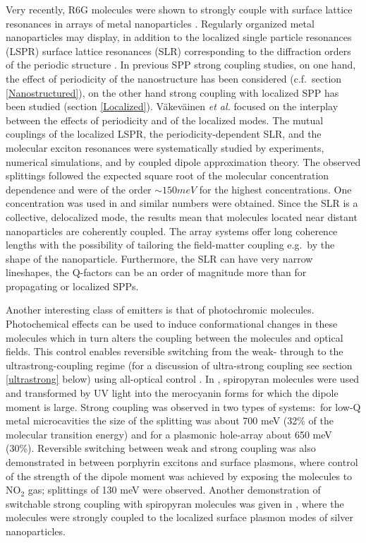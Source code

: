 \documentclass[12pt]{iopart}
\begin{document}
Very recently, R6G molecules were shown to strongly couple with surface lattice resonances in arrays of metal 
nanoparticles \cite{Rodriguez2013,Vakevainen2013}. Regularly organized metal nanoparticles may display, in addition to 
the localized single particle resonances (LSPR) surface lattice resonances (SLR) corresponding to the diffraction orders 
of the periodic structure \cite{Zou2004,GarciadeAbajo2007,Kravets2008,Auguie2008,Zhou2013}. In previous SPP strong 
coupling studies, on one hand, the effect of periodicity of the nanostructure has been considered 
(c.f.\ section \ref{Nanostructured}), on the other hand strong coupling with localized SPP has been studied 
(section \ref{Localized}). V\"akev\"ainen {\it et al.} \cite{Vakevainen2013} focused on the interplay between the effects 
of periodicity and of the 
localized modes. The mutual couplings of the localized LSPR, the periodicity-dependent SLR, and the molecular exciton resonances were systematically studied by experiments, numerical simulations, and by coupled dipole approximation theory. The observed splittings followed the expected square root of the molecular concentration dependence and were of the order $\sim 150 meV$ for the highest concentrations. One concentration was used in \cite{Rodriguez2013} and similar numbers were obtained. Since the SLR is a collective, delocalized mode, the results mean that molecules located near distant nanoparticles are coherently coupled. The array systems offer long coherence lengths with the possibility of tailoring the field-matter coupling e.g.\ by the shape of the nanoparticle. Furthermore, the SLR can have very narrow lineshapes, the Q-factors can be an order of magnitude more than for propagating or localized SPPs.  

Another interesting class of emitters is that of photochromic molecules. Photochemical effects can be used to induce conformational changes in these molecules which in turn alters the coupling between the molecules and optical fields. This control enables reversible switching from the weak- through to the ultrastrong-coupling regime (for a discussion of ultra-strong coupling see section \ref{ultrastrong} below) using all-optical control \cite{Schwartz2011}. In \cite{Schwartz2011}, spiropyran molecules were used and transformed by UV light into the merocyanin forms for which the dipole moment is large. Strong coupling was observed in two types of systems:\ for low-Q metal microcavities the size of the splitting was about 700 meV (32\% of the molecular transition energy) and for a plasmonic hole-array about 650 meV (30\%). Reversible switching between weak and strong coupling was also demonstrated in \cite{Berrier2011} between porphyrin excitons and surface plasmons, where control of the strength of the dipole moment was achieved by exposing the molecules to NO$_2$ gas; splittings of 130 meV were observed. Another demonstration of switchable strong coupling with spiropyran molecules was given in \cite{Baudrion2013}, where the molecules were strongly coupled to the localized surface plasmon modes of silver nanoparticles. 
\end{document}
